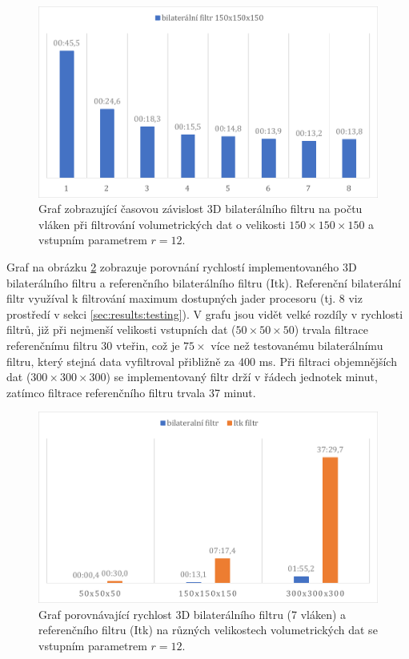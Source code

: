 \begin{figure} [H]
    \centering
    \label{fig:results:3dbl_threads}
    \includegraphics[width=1\textwidth]{figures/3dbl_threads.pdf}
    \caption{Graf zobrazující časovou závislost 3D bilaterálního filtru na počtu vláken při filtrování volumetrických dat o velikosti $150\times150\times150$ a vstupním parametrem $r=12$.}
\end{figure}

Graf na obrázku \ref{fig:results:3dbl} zobrazuje porovnání rychlostí implementovaného 3D bilaterálního filtru a referenčního bilaterálního filtru (Itk). Referenční bilaterální filtr využíval k filtrování maximum dostupných jader procesoru (tj. 8 viz prostředí v sekci \ref{sec:results:testing}). V grafu jsou vidět velké rozdíly v rychlosti filtrů, již při nejmenší velikosti vstupních dat ($50\times50\times50$) trvala filtrace referenčnímu filtru 30 vteřin, což je $75\times$ více než testovanému bilaterálnímu filtru, který stejná data vyfiltroval přibližně za 400 ms. Při filtraci objemnějších dat ($300\times300\times300$) se implementovaný filtr drží v řádech jednotek minut, zatímco filtrace referenčního filtru trvala 37 minut. 

\begin{figure} [H]
    \centering
    \label{fig:results:3dbl}
    \includegraphics[width=1\textwidth]{figures/3dbl.pdf}
    \caption{Graf porovnávající rychlost 3D bilaterálního filtru (7 vláken) a referenčního filtru (Itk) na různých velikostech volumetrických dat se vstupním parametrem $r=12$.}
\end{figure}

